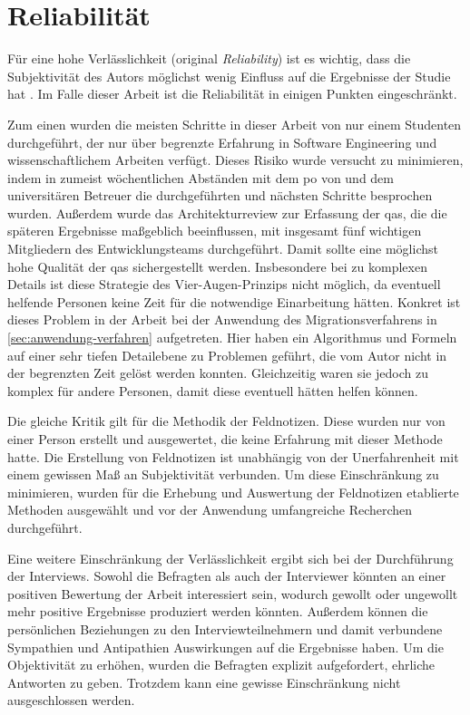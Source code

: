 \section{Reliabilität}

Für eine hohe Verlässlichkeit (original \emph{Reliability}) ist es wichtig, dass die Subjektivität des Autors möglichst wenig Einfluss auf die Ergebnisse der Studie hat \cite{Runeson2009}.
Im Falle dieser Arbeit ist die Reliabilität in einigen Punkten eingeschränkt.

Zum einen wurden die meisten Schritte in dieser Arbeit von nur einem Studenten durchgeführt, der nur über begrenzte Erfahrung in Software Engineering und wissenschaftlichem Arbeiten verfügt.
Dieses Risiko wurde versucht zu minimieren, indem in zumeist wöchentlichen Abständen mit dem \gls{po} von \jf und dem universitären Betreuer die durchgeführten und nächsten Schritte besprochen wurden.
Außerdem wurde das Architekturreview zur Erfassung der \glspl{qa}, die die späteren Ergebnisse maßgeblich beeinflussen, mit insgesamt fünf wichtigen Mitgliedern des Entwicklungsteams durchgeführt.
Damit sollte eine möglichst hohe Qualität der \glspl{qa} sichergestellt werden.
Insbesondere bei zu komplexen Details ist diese Strategie des Vier-Augen-Prinzips nicht möglich, da eventuell helfende Personen keine Zeit für die notwendige Einarbeitung hätten. 
Konkret ist dieses Problem in der Arbeit bei der Anwendung des Migrationsverfahrens in \cref{sec:anwendung-verfahren} aufgetreten.
Hier haben ein Algorithmus und Formeln auf einer sehr tiefen Detailebene zu Problemen geführt, die vom Autor nicht in der begrenzten Zeit gelöst werden konnten.
Gleichzeitig waren sie jedoch zu komplex für andere Personen, damit diese eventuell hätten helfen können.

Die gleiche Kritik gilt für die Methodik der Feldnotizen.
Diese wurden nur von einer Person erstellt und ausgewertet, die keine Erfahrung mit dieser Methode hatte.
Die Erstellung von Feldnotizen ist unabhängig von der Unerfahrenheit mit einem gewissen Maß an Subjektivität verbunden.
Um diese Einschränkung zu minimieren, wurden für die Erhebung und Auswertung der Feldnotizen etablierte Methoden ausgewählt und vor der Anwendung umfangreiche Recherchen durchgeführt.

Eine weitere Einschränkung der Verlässlichkeit ergibt sich bei der Durchführung der Interviews. 
Sowohl die Befragten als auch der Interviewer könnten an einer positiven Bewertung der Arbeit interessiert sein, wodurch gewollt oder ungewollt mehr positive Ergebnisse produziert werden könnten.
Außerdem können die persönlichen Beziehungen zu den Interviewteilnehmern und damit verbundene Sympathien und Antipathien Auswirkungen auf die Ergebnisse haben.
Um die Objektivität zu erhöhen, wurden die Befragten explizit aufgefordert, ehrliche Antworten zu geben. 
Trotzdem kann eine gewisse Einschränkung nicht ausgeschlossen werden.

